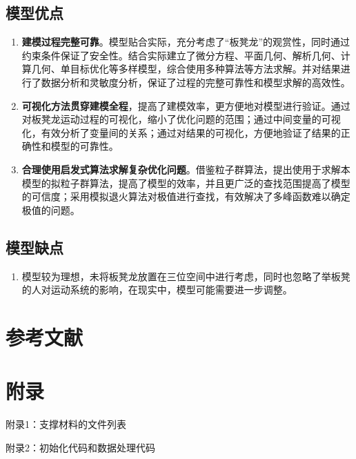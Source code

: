 \documentclass[a4paper]{article}
\begin{document}
	\subsection{模型优点}
	\begin{enumerate}
		\item \textbf{建模过程完整可靠}。模型贴合实际，充分考虑了“板凳龙”的观赏性，同时通过约束条件保证了安全性。结合实际建立了微分方程、平面几何、解析几何、计算几何、单目标优化等多样模型，综合使用多种算法等方法求解。并对结果进行了数据分析和灵敏度分析，保证了过程的完整可靠性和模型求解的高效性。
		\item \textbf{可视化方法贯穿建模全程}，提高了建模效率，更方便地对模型进行验证。通过对板凳龙运动过程的可视化，缩小了优化问题的范围；通过中间变量的可视化，有效分析了变量间的关系；通过对结果的可视化，方便地验证了结果的正确性和模型的可靠性。
		\item \textbf{合理使用启发式算法求解复杂优化问题}。借鉴粒子群算法，提出使用于求解本模型的拟粒子群算法，提高了模型的效率，并且更广泛的查找范围提高了模型的可信度；采用模拟退火算法对极值进行查找，有效解决了多峰函数难以确定极值的问题。
	\end{enumerate}

	\subsection{模型缺点}
	\begin{enumerate}
		\item 模型较为理想，未将板凳龙放置在三位空间中进行考虑，同时也忽略了举板凳的人对运动系统的影响，在现实中，模型可能需要进一步调整。
	\end{enumerate}

	
	\section{参考文献}
	\vspace{-2em} %
	\begin{thebibliography}{9}  
	\end{thebibliography}
	
	\newpage
	\section*{附录}
	
	附录1：支撑材料的文件列表
	
	
	
	附录2：初始化代码和数据处理代码
	
\end{document}
